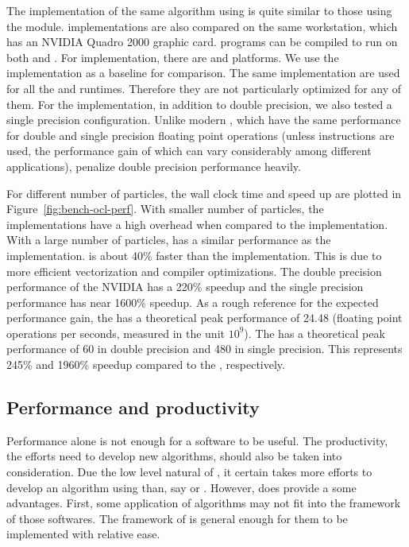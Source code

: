 The implementation of the same algorithm using \opencl is quite similar to
those using the \smp module. \opencl implementations are also compared on the
same workstation, which has an NVIDIA Quadro 2000 graphic card. \opencl
programs can be compiled to run on both \cpu and \gpu. For \cpu
implementation, there are \iocl \cite{iocl} and \aocl \cite{aocl} platforms.
We use the \tbb implementation as a baseline for comparison. The same \opencl
implementation are used for all the \cpu and \gpu runtimes. Therefore they are
not particularly optimized for any of them. For the \gpu implementation, in
addition to double precision, we also tested a single precision configuration.
Unlike modern \cpu, which have the same performance for double and single
precision floating point operations (unless \simd instructions are used, the
performance gain of which can vary considerably among different applications),
\gpu penalize double precision performance heavily.

For different number of particles, the wall clock time and speed up are
plotted in Figure~\ref{fig:bench-ocl-perf}. With smaller number of particles,
the \opencl implementations have a high overhead when compared to the \tbb
implementation. With a large number of particles, \aocl has a similar
performance as the \tbb implementation. \iocl is about 40\% faster than the
\tbb implementation. This is due to more efficient vectorization and compiler
optimizations. The double precision performance of the NVIDIA \gpu has a
220\% speedup and the single precision performance has near 1600\% speedup.
As a rough reference for the expected performance gain, the \cpu has a
theoretical peak performance of 24.48 \gflops (floating point operations per
seconds, measured in the unit $10^9$). The \gpu has a theoretical peak
performance of 60 \gflops in double precision and 480 \gflops in single
precision. This represents 245\% and 1960\% speedup compared to the \cpu,
respectively.

\afterpage{\clearpage}

\subsection{Performance and productivity}
\label{sub:Performance and productivity}

Performance alone is not enough for a software to be useful. The productivity,
the efforts need to develop new algorithms, should also be taken into
consideration. Due the low level natural of \cpp, it certain takes more
efforts to develop an algorithm using \vsmc than, say \libbi or \biips.
However, \smc does provide a some advantages. First, some application of \smc
algorithms may not fit into the framework of those softwares. The framework of
\smc is general enough for them to be implemented with relative ease.

